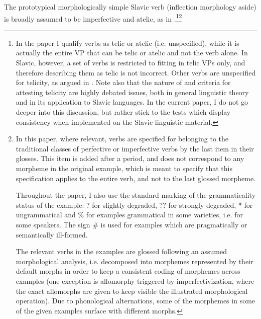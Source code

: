 \documentclass[output=paper]{langscibook}
\begin{document}
The prototypical morphologically simple Slavic verb (inflection morphology aside) is broadly assumed to be imperfective and atelic, as in .\footnote{In the paper I qualify verbs as telic or atelic (i.e. unspecified), while it is actually the entire VP that can be telic or atelic and not the verb alone. In Slavic, however, a set of verbs is restricted to fitting in telic VPs only, and therefore describing them as telic is not incorrect. Other verbs are unspecified for telicity, as argued in . Note also that the nature of and criteria for attesting telicity are highly debated issues, both in general linguistic theory and in its application to Slavic languages. In the current paper, I do not go deeper into this discussion, but rather stick to the tests which display consistency when implemented on the Slavic linguistic material.}\footnote{In this paper, where relevant, verbs are specified for belonging to the traditional classes of perfective or imperfective verbs by the last item in their glosses. This item is added after a period, and does not correspond to any morpheme in the original example, which is meant to specify that this specification applies to the entire verb, and not to the last glossed morpheme.
 
Throughout the paper, I also use the standard marking of the grammaticality status of the example: ? for slightly degraded, ?? for strongly degraded, * for ungrammatical and {\%} for examples grammatical in some varieties, i.e. for some speakers. The sign {\#} is used for examples which are pragmatically or semantically ill-formed.

The relevant verbs in the examples are glossed following an assumed morphological analysis, i.e. decomposed into morphemes represented by their default morphs in order to keep a consistent coding of morphemes across examples (one exception is allomorphy triggered by imperfectivization, where the exact allomorphs are given to keep visible the illustrated morphological operation). Due to phonological alternations, some of the morphemes in some of the given examples surface with different morphs.

}
\end{document}
